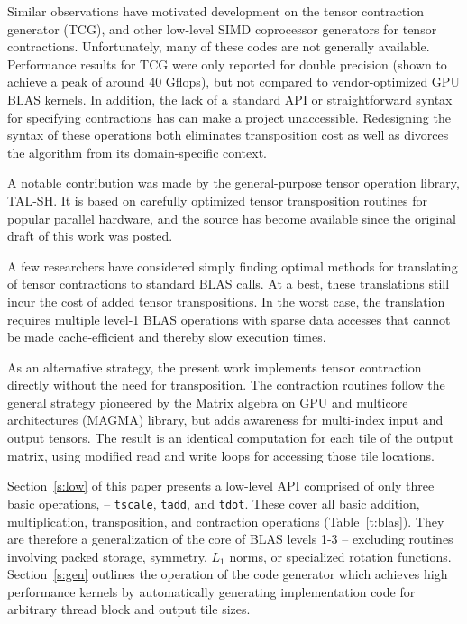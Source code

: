 \documentclass{sigplanconf}
\begin{document}
  Similar observations have motivated development on the tensor contraction generator (TCG),
\cite{tcg,wma10,wma11} and other low-level SIMD coprocessor generators
for tensor contractions.\cite{hshan15,tnels15}
Unfortunately, many of these codes are not generally available.
Performance results for TCG were only reported for double precision
(shown to achieve a peak of around 40 Gflops), but not compared to vendor-optimized GPU
BLAS kernels.  In addition, the lack of a standard API or
straightforward syntax for specifying contractions has can make a project unaccessible.
Redesigning the syntax of these operations both eliminates
transposition cost as well as divorces the algorithm from its domain-specific context.

  A notable contribution was made by the general-purpose tensor
operation library, TAL-SH.  It is based on carefully optimized
tensor transposition routines for popular parallel hardware,\cite{dlyak15}
and the source has become available since the original draft of
this work was posted.

  A few researchers have considered simply finding optimal methods for
translating of tensor contractions to standard BLAS calls.\cite{slice,enapo14,epeis15}
At a best, these translations still incur the
cost of added tensor transpositions.  In the worst case, the translation requires multiple
level-1 BLAS operations with sparse data accesses that cannot be made cache-efficient
and thereby slow execution times.

  As an alternative strategy, the present work implements
tensor contraction directly without the need for transposition.
The contraction routines follow the general strategy pioneered by
the %
Matrix algebra on
GPU and multicore architectures (MAGMA) library,\cite{magma}
but adds awareness for multi-index input and output tensors.  The result
is an identical computation for each tile of the output matrix, using
modified read and write loops for accessing those tile locations.

  Section~\ref{s:low} of this paper presents a low-level API comprised of only three basic operations,
-- {\tt tscale}, {\tt tadd}, and {\tt tdot}.  These  cover all basic addition, multiplication, transposition,
and contraction operations (Table~\ref{t:blas}).
They are therefore a generalization of the core of BLAS levels 1-3
-- excluding routines involving packed storage, symmetry, $L_1$ norms, or specialized rotation functions.
Section~\ref{s:gen} outlines the operation of the code generator which
achieves high performance kernels by automatically generating implementation
code for arbitrary thread block and output tile sizes.
\end{document}

